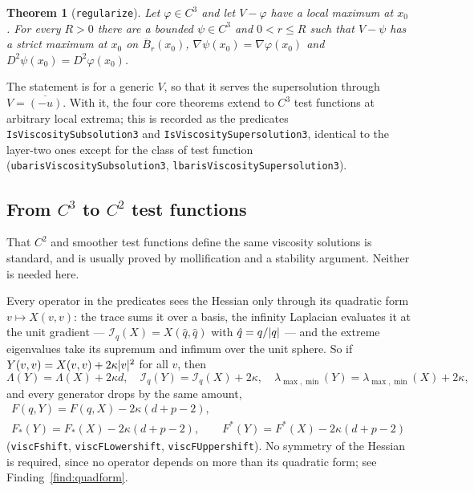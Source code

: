 \documentclass[11pt,reqno]{amsart}
\newcommand{\LEANREF}[1]{\texttt{\small\def\_{\textunderscore\allowbreak}#1}}
\DeclarePairedDelimiter{\abs}{\lvert}{\rvert}
\theoremstyle{plain}
\newtheorem{theorem}{Theorem}[section]
\theoremstyle{definition}
\begin{document}
\begin{theorem}[\LEANREF{regularize}]\label{thm:regularize}
Let $\varphi \in C^3$ and let $V - \varphi$ have a local maximum at $x_0$. For
every $R > 0$ there are a bounded $\psi \in C^3$ and $0 < r \le R$ such that
$V - \psi$ has a strict maximum at $x_0$ on $\overline{B}_r(x_0)$,
$\nabla\psi(x_0) = \nabla\varphi(x_0)$ and
$D^2\psi(x_0) = D^2\varphi(x_0)$.
\end{theorem}

The statement is for a generic $V$, so that it serves the supersolution through
$V = \overline{(-u)}$. With it, the four core theorems extend to $C^3$ test
functions at arbitrary local extrema; this is recorded as the predicates
\LEANREF{IsViscositySubsolution3} and \LEANREF{IsViscositySupersolution3},
identical to the layer-two ones except for the class of test function
(\LEANREF{ubar\_isViscositySubsolution3},
\LEANREF{lbar\_isViscositySupersolution3}).

\subsection{From \texorpdfstring{$C^3$}{C3} to \texorpdfstring{$C^2$}{C2} test functions}\label{ssec:c2}

That $C^2$ and smoother test functions define the same viscosity solutions is
standard, and is usually proved by mollification and a stability argument.
Neither is needed here.

Every operator in the predicates sees the Hessian only through its quadratic
form $v \mapsto X(v,v)$: the trace sums it over a basis, the infinity Laplacian
evaluates it at the unit gradient ---
$\mathcal{I}_q(X) = X(\hat q, \hat q)$ with $\hat q = q/\abs{q}$ ---
and the extreme eigenvalues take its supremum and infimum over the unit sphere.
So if $Y(v,v) = X(v,v) + 2\kappa\abs{v}^2$ for all $v$, then
\[
  \Lambda(Y) = \Lambda(X) + 2\kappa d,\quad
  \mathcal{I}_q(Y) = \mathcal{I}_q(X) + 2\kappa,\quad
  \lambda_{\max,\min}(Y) = \lambda_{\max,\min}(X) + 2\kappa,
\]
and every generator drops by the same amount,
\begin{equation}\label{eq:shift}
\begin{gathered}
  F(q, Y) = F(q, X) - 2\kappa(d + p - 2), \\
  F_*(Y) = F_*(X) - 2\kappa(d+p-2), \qquad
  F^*(Y) = F^*(X) - 2\kappa(d+p-2)
\end{gathered}
\end{equation}
(\LEANREF{viscF\_shift}, \LEANREF{viscFLower\_shift},
\LEANREF{viscFUpper\_shift}). No symmetry of the Hessian is required, since no
operator depends on more than its quadratic form; see
Finding~\ref{find:quadform}.
\end{document}
